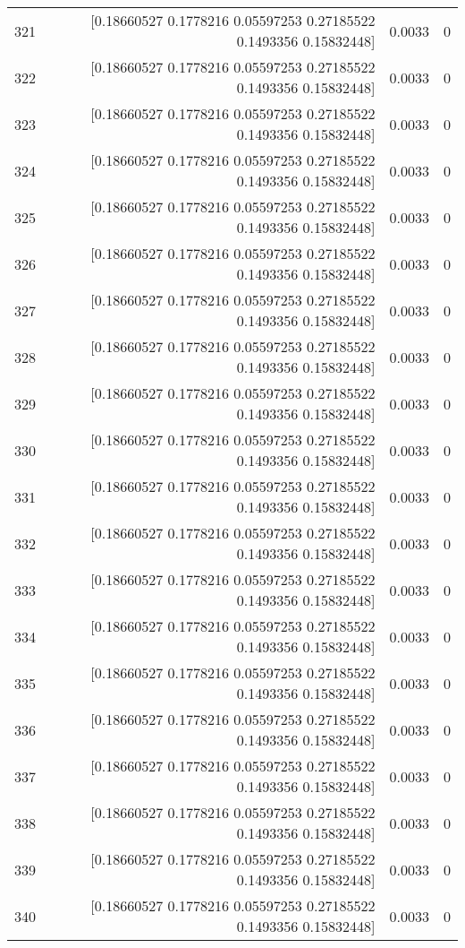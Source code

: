 \begin{longtable}{lrrr}
321 & [0.18660527 0.1778216  0.05597253 0.27185522 0.1493356  0.15832448] & 0.0033 & 0 \\
322 & [0.18660527 0.1778216  0.05597253 0.27185522 0.1493356  0.15832448] & 0.0033 & 0 \\
323 & [0.18660527 0.1778216  0.05597253 0.27185522 0.1493356  0.15832448] & 0.0033 & 0 \\
324 & [0.18660527 0.1778216  0.05597253 0.27185522 0.1493356  0.15832448] & 0.0033 & 0 \\
325 & [0.18660527 0.1778216  0.05597253 0.27185522 0.1493356  0.15832448] & 0.0033 & 0 \\
326 & [0.18660527 0.1778216  0.05597253 0.27185522 0.1493356  0.15832448] & 0.0033 & 0 \\
327 & [0.18660527 0.1778216  0.05597253 0.27185522 0.1493356  0.15832448] & 0.0033 & 0 \\
328 & [0.18660527 0.1778216  0.05597253 0.27185522 0.1493356  0.15832448] & 0.0033 & 0 \\
329 & [0.18660527 0.1778216  0.05597253 0.27185522 0.1493356  0.15832448] & 0.0033 & 0 \\
330 & [0.18660527 0.1778216  0.05597253 0.27185522 0.1493356  0.15832448] & 0.0033 & 0 \\
331 & [0.18660527 0.1778216  0.05597253 0.27185522 0.1493356  0.15832448] & 0.0033 & 0 \\
332 & [0.18660527 0.1778216  0.05597253 0.27185522 0.1493356  0.15832448] & 0.0033 & 0 \\
333 & [0.18660527 0.1778216  0.05597253 0.27185522 0.1493356  0.15832448] & 0.0033 & 0 \\
334 & [0.18660527 0.1778216  0.05597253 0.27185522 0.1493356  0.15832448] & 0.0033 & 0 \\
335 & [0.18660527 0.1778216  0.05597253 0.27185522 0.1493356  0.15832448] & 0.0033 & 0 \\
336 & [0.18660527 0.1778216  0.05597253 0.27185522 0.1493356  0.15832448] & 0.0033 & 0 \\
337 & [0.18660527 0.1778216  0.05597253 0.27185522 0.1493356  0.15832448] & 0.0033 & 0 \\
338 & [0.18660527 0.1778216  0.05597253 0.27185522 0.1493356  0.15832448] & 0.0033 & 0 \\
339 & [0.18660527 0.1778216  0.05597253 0.27185522 0.1493356  0.15832448] & 0.0033 & 0 \\
340 & [0.18660527 0.1778216  0.05597253 0.27185522 0.1493356  0.15832448] & 0.0033 & 0 \\

\end{longtable}
